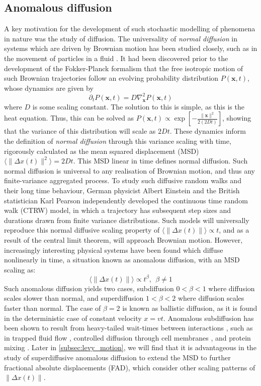 \subsection{Anomalous diffusion}\label{subsec:anom_diff}
A key motivation for the development of such stochastic modelling of phenomena in nature was the study of diffusion. The universality of \textit{normal diffusion} in systems which are driven by Brownian motion has been studied closely, such as in the movement of particles in a fluid \cite{klafter_anomalous_2005, metzler_anomalous_2014, Merritt2007a}. It had been discovered prior to the development of the Fokker-Planck formalism that the free isotropic motion of such Brownian trajectories follow an evolving probability distribution $P(\textbf{x},t)$, whose dynamics are given by
\begin{equation}
    \partial_t P(\textbf{x},t) = D \nabla_{\textbf{x}}^2 P(\textbf{x},t)
\end{equation}
where $D$ is some scaling constant. The solution to this is simple, as this is the heat equation. Thus, this can be solved as $P(\textbf{x},t) \propto \exp\left[ -\frac{\|\textbf{x} \|^2}{2(2Dt)}\right]$, showing that the variance of this distribution will scale as $2Dt$. These dynamics inform the definition of \textit{normal diffusion} through this variance scaling with time, rigorously calculated as the mean squared displacement (MSD) $\langle \|\Delta x (t) \|^2 \rangle = 2Dt$. This MSD linear in time defines normal diffusion. Such normal diffusion is universal to any realisation of Brownian motion, and thus any finite-variance aggregated process. To study such diffusive random walks and their long time behaviour, German physicist Albert Einstein and the British statistician Karl Pearson independently developed the continuous time random walk (CTRW) model, in which a trajectory has subsequent step sizes and durations drawn from finite variance distributions. Such models will universally reproduce this normal diffusive scaling property of $\langle \| \Delta x (t) \| \rangle \propto t$, and as a result of the central limit theorem, will approach Brownian motion. However, increasingly interesting physical systems have been found which diffuse nonlinearly in time, a situation known as anomalous diffusion, with an MSD scaling as:
\begin{equation}
    \langle \| \Delta x (t) \| \rangle \propto t^{\beta}, \ \ \beta \neq 1
\end{equation}
Such anomalous diffusion yields two cases, subdiffusion $0 < \beta < 1$ where diffusion scales slower than normal, and superdiffusion $1 < \beta < 2$ where diffusion scales faster than normal. The case of $\beta = 2$ is known as ballistic diffusion, as it is found in the deterministic case of constant velocity $x = vt$. Anomalous subdiffusion has been shown to result from heavy-tailed wait-times between interactions \cite{klafter_anomalous_2005}, such as in trapped fluid flow \cite{Kirchner2000-kf}, controlled diffusion through cell membranes \cite{klafter_anomalous_2005}, and protein mixing \cite{Kou2004-kz}. Later in \cref{subsec:levy_motion}, we will find that it is advantageous in the study of superdiffusive anomalous diffusion to extend the MSD to further fractional absolute displacements (FAD), which consider other scaling patterns of $\| \Delta x(t)\|$.
